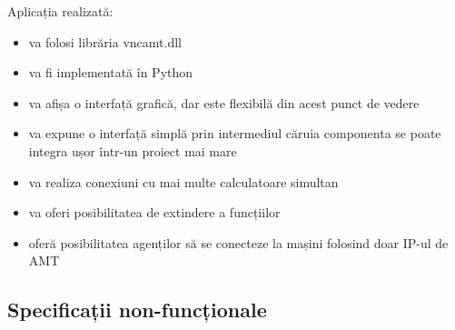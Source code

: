 Aplicația realizată:
\begin{itemize}
  \item va folosi librăria vncamt.dll
  \item va fi implementată în Python
  \item va afișa o interfață grafică, dar este flexibilă din acest punct de vedere
  \item va expune o interfață simplă prin intermediul căruia componenta se poate integra ușor într-un proiect mai mare
  \item va realiza conexiuni cu mai multe calculatoare simultan
  \item va oferi posibilitatea de extindere a funcțiilor
  \item oferă posibilitatea agenților să se conecteze la mașini folosind doar IP-ul de AMT
  
\end{itemize}

\subsection{Specificații non-funcționale}




